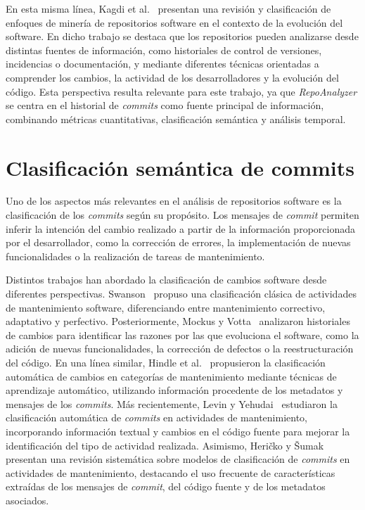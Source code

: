 \documentclass[a4paper, 12pt]{book}
\begin{document}
En esta misma línea, Kagdi et al.~\cite{kagdi2007survey} presentan una revisión y clasificación de enfoques de minería de repositorios software en el contexto de la evolución del software. En dicho trabajo se destaca que los repositorios pueden analizarse desde distintas fuentes de información, como historiales de control de versiones, incidencias o documentación, y mediante diferentes técnicas orientadas a comprender los cambios, la actividad de los desarrolladores y la evolución del código. Esta perspectiva resulta relevante para este trabajo, ya que \emph{RepoAnalyzer} se centra en el historial de \emph{commits} como fuente principal de información, combinando métricas cuantitativas, clasificación semántica y análisis temporal.

\section{Clasificación semántica de commits}
\label{sec:clasificacion}

Uno de los aspectos más relevantes en el análisis de repositorios software es la clasificación de los \emph{commits} según su propósito. Los mensajes de \emph{commit} permiten inferir la intención del cambio realizado a partir de la información proporcionada por el desarrollador, como la corrección de errores, la implementación de nuevas funcionalidades o la realización de tareas de mantenimiento.

Distintos trabajos han abordado la clasificación de cambios software desde diferentes perspectivas. Swanson~\cite{swanson1976dimensions} propuso una clasificación clásica de actividades de mantenimiento software, diferenciando entre mantenimiento correctivo, adaptativo y perfectivo. Posteriormente, Mockus y Votta~\cite{mockus2000identifying} analizaron historiales de cambios para identificar las razones por las que evoluciona el software, como la adición de nuevas funcionalidades, la corrección de defectos o la reestructuración del código. En una línea similar, Hindle et al.~\cite{hindle2009automatic} propusieron la clasificación automática de cambios en categorías de mantenimiento mediante técnicas de aprendizaje automático, utilizando información procedente de los metadatos y mensajes de los \emph{commits}. Más recientemente, Levin y Yehudai~\cite{levin2017boosting} estudiaron la clasificación automática de \emph{commits} en actividades de mantenimiento, incorporando información textual y cambios en el código fuente para mejorar la identificación del tipo de actividad realizada. Asimismo, Heri{\v{c}}ko y {\v{S}}umak~\cite{hericko2023commit} presentan una revisión sistemática sobre modelos de clasificación de \emph{commits} en actividades de mantenimiento, destacando el uso frecuente de características extraídas de los mensajes de \emph{commit}, del código fuente y de los metadatos asociados.
\end{document}
